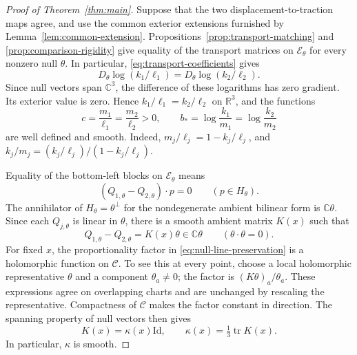 \documentclass[11pt]{article}
\newcommand{\R}{\mathbb R}
\newcommand{\C}{\mathbb C}
\newcommand{\Id}{\mathrm{Id}}
\DeclareMathOperator{\tr}{tr}
\newcommand{\Ecal}{\mathcal E}
\theoremstyle{remark}
\numberwithin{equation}{section}
\begin{document}
\begin{proof}[Proof of Theorem~\ref{thm:main}]
Suppose that the two displacement-to-traction maps agree, and use the
common exterior extensions furnished by Lemma~\ref{lem:common-extension}.
Propositions~\ref{prop:transport-matching} and
\ref{prop:comparison-rigidity} give equality of the transport matrices
on $\Ecal_\theta$ for every nonzero null $\theta$.  In particular,
\eqref{eq:transport-coefficients} gives
\[
 D_\theta\log(k_1/\ell_1)
   =D_\theta\log(k_2/\ell_2).
\]
Since null vectors span $\C^3$, the difference of these logarithms has
zero gradient.  Its exterior value is zero.  Hence $k_1/\ell_1=k_2/\ell_2$
on $\R^3$, and the functions
\begin{equation}\label{eq:common-ratios}
 c=\frac{m_1}{\ell_1}=\frac{m_2}{\ell_2}>0,
 \qquad b_* =\log\frac{k_1}{m_1}=\log\frac{k_2}{m_2}
\end{equation}
are well defined and smooth.  Indeed, $m_j/\ell_j=1-k_j/\ell_j$, and
$k_j/m_j=(k_j/\ell_j)/(1-k_j/\ell_j)$.

Equality of the bottom-left blocks on $\Ecal_\theta$ means
\[
 (Q_{1,\theta}-Q_{2,\theta})\cdot p=0
 \qquad(p\in H_\theta).
\]
The annihilator of $H_\theta=\theta^\perp$ for the nondegenerate
ambient bilinear form is $\C\theta$.  Since each $Q_{j,\theta}$ is
linear in $\theta$, there is a smooth ambient matrix $K(x)$ such that
\begin{equation}\label{eq:null-line-preservation}
 Q_{1,\theta}-Q_{2,\theta}=K(x)\theta\in\C\theta
 \qquad(\theta\cdot\theta=0).
\end{equation}
For fixed $x$, the proportionality factor in
\eqref{eq:null-line-preservation} is a holomorphic function on $\mathcal C$.
To see this at every point, choose a local holomorphic representative
$\theta$ and a component $\theta_a\ne0$; the factor is
$(K\theta)_a/\theta_a$.  These expressions agree on overlapping charts
and are unchanged by rescaling the representative.  Compactness of
$\mathcal C$ makes the factor constant in direction.  The spanning
property of null vectors then gives
\begin{equation}\label{eq:scalar-ambient-difference}
 K(x)=\kappa(x)\Id,\qquad \kappa(x)=\tfrac13\tr K(x).
\end{equation}
In particular, $\kappa$ is smooth.


\end{proof}
\end{document}
